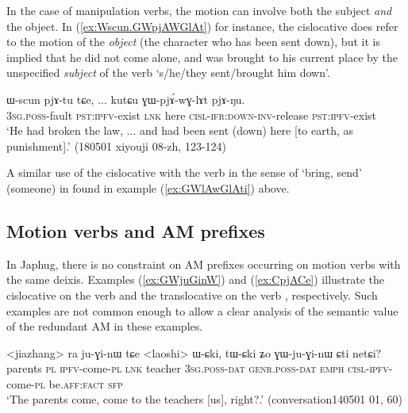 In the case of manipulation verbs, the motion can involve both the subject \textit{and} the object. In (\ref{ex:Wscun.GWpjAWGlAt}) for instance, the cislocative does refer to the motion of the \textit{object} (the character who has been sent down), but it is implied that he did not come alone, and was brought to his current place by the unspecified \textit{subject} of the verb  `s/he/they sent/brought him down'.

\begin{exe}
	\ex \label{ex:Wscun.GWpjAWGlAt}
	\gll ɯ-scun pjɤ-tu tɕe,  ... kutɕu ɣɯ-pjɤ́-wɣ-lɤt pjɤ-ŋu.  \\
	\textsc{3sg}.\textsc{poss}-fault \textsc{pst}:\textsc{ipfv}-exist \textsc{lnk} { } here  \textsc{cisl}-\textsc{ifr}:\textsc{down}-\textsc{inv}-release \textsc{pst}:\textsc{ipfv}-exist \\ 
	\glt `He had broken the law, ... and had been sent (down) here [to earth, as punishment].' (180501 xiyouji 08-zh, 123-124) 
\end{exe} 

A similar use of the cislocative with the verb  in the sense of `bring, send' (someone) in found in example (\ref{ex:GWlAwGlAti}) above.

\subsection{Motion verbs and AM prefixes} \label{sec:motion.verbs.AM}
In Japhug, there is no constraint on AM prefixes occurring on motion verbs with the same deixis. Examples (\ref{ex:GWjuGinW}) and (\ref{ex:CpjACe}) illustrate the cislocative on the verb  and the translocative on the verb , respectively. Such examples are not common enough to allow a clear analysis of the semantic value of the redundant AM in these examples.

\begin{exe}
\ex \label{ex:GWjuGinW}
 \gll <jiazhang> ra ju-ɣi-nɯ tɕe <laoshi> ɯ-ɕki, tɯ-ɕki ʑo ɣɯ-ju-ɣi-nɯ ɕti netɕi? \\
 parents \textsc{pl} \textsc{ipfv}-come-\textsc{pl} \textsc{lnk} teacher \textsc{3sg}.\textsc{poss}-\textsc{dat} \textsc{genr}.\textsc{poss}-\textsc{dat} \textsc{emph} \textsc{cisl}-\textsc{ipfv}-come-\textsc{pl} be.\textsc{aff}:\textsc{fact} \textsc{sfp} \\
 \glt `The parents come, come to the teachers [us], right?.' (conversation140501 01, 60)
\end{exe}

